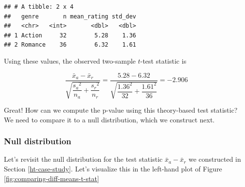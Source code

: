 \documentclass[
]{book}
\newenvironment{Shaded}{\begin{snugshade}}{\end{snugshade}}
\newcommand{\CommentTok}[1]{\textcolor[rgb]{0.56,0.35,0.01}{\textit{#1}}}
\newcommand{\DataTypeTok}[1]{\textcolor[rgb]{0.13,0.29,0.53}{#1}}
\newcommand{\DecValTok}[1]{\textcolor[rgb]{0.00,0.00,0.81}{#1}}
\newcommand{\KeywordTok}[1]{\textcolor[rgb]{0.13,0.29,0.53}{\textbf{#1}}}
\newcommand{\NormalTok}[1]{#1}
\newcommand{\OperatorTok}[1]{\textcolor[rgb]{0.81,0.36,0.00}{\textbf{#1}}}
\newcommand{\StringTok}[1]{\textcolor[rgb]{0.31,0.60,0.02}{#1}}
\begin{document}
\begin{verbatim}
## # A tibble: 2 x 4
##   genre       n mean_rating std_dev
##   <chr>   <int>       <dbl>   <dbl>
## 1 Action     32        5.28    1.36
## 2 Romance    36        6.32    1.61
\end{verbatim}

Using these values, the observed two-sample \(t\)-test statistic is

\[
\dfrac{ \bar{x}_a - \bar{x}_r}{ \sqrt{\dfrac{{s_a}^2}{n_a} + \dfrac{{s_r}^2}{n_r}}  } = 
\dfrac{5.28 - 6.32}{ \sqrt{\dfrac{{1.36}^2}{32} + \dfrac{{1.61}^2}{36}}  } = 
-2.906
\]

Great! How can we compute the p-value using this theory-based test statistic? We need to compare it to a null distribution, which we construct next.

\hypertarget{null-distribution}{%
\subsubsection*{Null distribution}\label{null-distribution}}

Let's revisit the null distribution for the test statistic \(\bar{x}_a - \bar{x}_r\) we constructed in Section \ref{ht-case-study}. Let's visualize this in the left-hand plot of Figure \ref{fig:comparing-diff-means-t-stat}

\begin{Shaded}
\end{Shaded}
\end{document}
